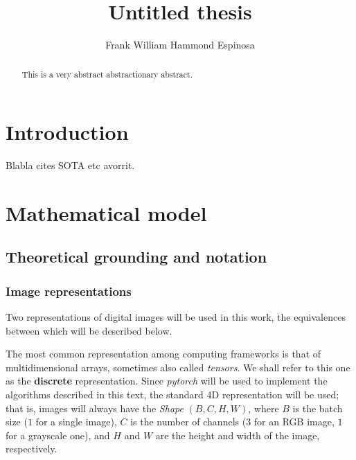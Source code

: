 \documentclass[twocolumn,twoside,a4paper,10pt]{IEEEtran}
\title{Untitled thesis}
\author{Frank William Hammond Espinosa}
\begin{document}

\maketitle




\begin{abstract}
\noindent This is a very abstract abstractionary abstract.
\end{abstract}

\section{Introduction}
Blabla cites SOTA etc avorrit.


\section{Mathematical model}
\subsection{Theoretical grounding and notation}\label{subsec:theoretical-grounding}
\subsubsection{Image representations}

Two representations of digital images will be used in this work, the equivalences between which will be described below.

The most common representation among computing frameworks is that of multidimensional arrays, sometimes also called \textit{tensors}. We shall refer to this one as the \textbf{discrete} representation. Since \textit{pytorch} will be used to implement the algorithms described in this text, the standard 4D representation will be used; that is, images will always have the \textit{Shape} \((B, C, H, W)\), where \(B\) is the batch size (\(1\) for a single image), \(C\) is the number of channels (\(3\) for an RGB image, \(1\) for a grayscale one), and \(H\) and \(W\) are the height and width of the image, respectively.
\end{document}
